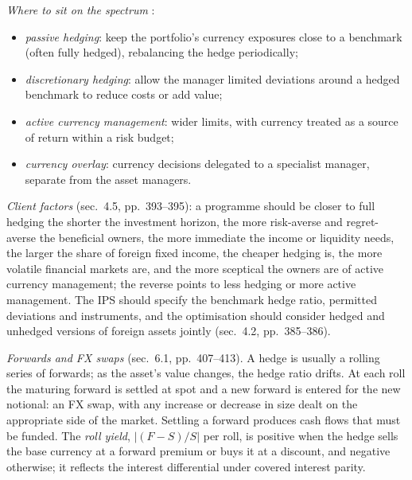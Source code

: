 \begin{qfmethod}\label{meth:currency-hedging-programme}
 \emph{Where to sit on the spectrum} \citep[chap.~8, sec.~4.4, pp.~389--393]{portfolio-management-in-practice-v1-2020}:
\begin{itemize}
\item \emph{passive hedging}: keep the portfolio's currency exposures close to a benchmark (often fully hedged), rebalancing the hedge periodically;
\item \emph{discretionary hedging}: allow the manager limited deviations around a hedged benchmark to reduce costs or add value;
\item \emph{active currency management}: wider limits, with currency treated as a source of return within a risk budget;
\item \emph{currency overlay}: currency decisions delegated to a specialist manager, separate from the asset managers.
\end{itemize}
\emph{Client factors} (sec.~4.5, pp.~393--395): a programme should be closer to full hedging the shorter the investment horizon, the more risk-averse and regret-averse the beneficial owners, the more immediate the income or liquidity needs, the larger the share of foreign fixed income, the cheaper hedging is, the more volatile financial markets are, and the more sceptical the owners are of active currency management; the reverse points to less hedging or more active management. The IPS should specify the benchmark hedge ratio, permitted deviations and instruments, and the optimisation should consider hedged and unhedged versions of foreign assets jointly (sec.~4.2, pp.~385--386).

\emph{Forwards and FX swaps} (sec.~6.1, pp.~407--413). A hedge is usually a rolling series of forwards; as the asset's value changes, the hedge ratio drifts. At each roll the maturing forward is settled at spot and a new forward is entered for the new notional: an FX swap, with any increase or decrease in size dealt on the appropriate side of the market. Settling a forward produces cash flows that must be funded. The \emph{roll yield}, $|(F-S)/S|$ per roll, is positive when the hedge sells the base currency at a forward premium or buys it at a discount, and negative otherwise; it reflects the interest differential under covered interest parity.


\end{qfmethod}
